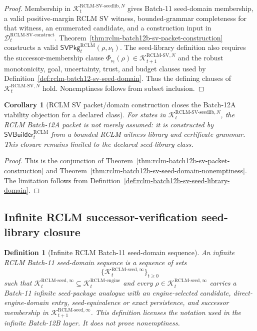 \documentclass[11pt,a4paper]{article}
\newtheorem{corollary}[theorem]{Corollary}
\newtheorem{definition}[theorem]{Definition}
\newcommand{\Kcal}{\mathcal K}
\newcommand{\Dcal}{\mathcal D}
\newcommand{\RCLM}{\mathrm{RCLM}}
\newcommand{\engine}{\mathrm{engine}}
\begin{document}
\begin{proof}
Membership in \(\Kcal_t^{\RCLM\text{-}\mathrm{SV\mbox{-}seedlib},N}\) gives Batch-11 seed-domain membership, a valid positive-margin RCLM SV witness, bounded-grammar completeness for that witness, an enumerated candidate, and a construction input in \(\Dcal_t^{\RCLM\text{-}\mathrm{SV\mbox{-}construct}}\). Theorem~\ref{thm:rclm-batch12b-sv-packet-construction} constructs a valid \(\mathsf{SVPkg}_t^{\RCLM}(\rho,\nu_t)\). The seed-library definition also requires the successor-membership clause \(\Phi_{\nu_t}(\rho)\in\Kcal_{t+1}^{\RCLM\text{-}\mathrm{SV},N}\) and the robust monotonicity, goal, uncertainty, trust, and budget clauses used by Definition~\ref{def:rclm-batch12-sv-seed-domain}. Thus the defining clauses of \(\Kcal_t^{\RCLM\text{-}\mathrm{SV},N}\) hold. Nonemptiness follows from subset inclusion.
\end{proof}

\begin{corollary}[RCLM SV packet/domain construction closes the Batch-12A viability objection for a declared class]
\label{cor:rclm-batch12b-closes-viability-objection-declared-class}
For states in \(\Kcal_t^{\RCLM\text{-}\mathrm{SV\mbox{-}seedlib},N}\), the RCLM Batch-12A packet is not merely assumed: it is constructed by \(\mathsf{SVBuilder}_t^{\RCLM}\) from a bounded RCLM witness library and certificate grammar. This closure remains limited to the declared seed-library class.
\end{corollary}

\begin{proof}
This is the conjunction of Theorem~\ref{thm:rclm-batch12b-sv-packet-construction} and Theorem~\ref{thm:rclm-batch12b-sv-seed-domain-nonemptiness}. The limitation follows from Definition~\ref{def:rclm-batch12b-sv-seed-library-domain}.
\end{proof}

\subsection{Infinite RCLM successor-verification seed-library closure}

\begin{definition}[Infinite RCLM Batch-11 seed-domain sequence]
\label{def:rclm-batch12b-infinite-batch11-seed-domain}
An infinite RCLM Batch-11 seed-domain sequence is a sequence of sets
\[
\{\Kcal_t^{\RCLM\text{-}\mathrm{seed},\infty}\}_{t\ge0}
\]
such that \(\Kcal_t^{\RCLM\text{-}\mathrm{seed},\infty}\subseteq\Kcal_t^{\RCLM\text{-}\engine}\) and every \(\rho\in\Kcal_t^{\RCLM\text{-}\mathrm{seed},\infty}\) carries a Batch-11 infinite seed-package analogue with an engine-selected candidate, direct-engine-domain entry, seed-equivalence or exact persistence, and successor membership in \(\Kcal_{t+1}^{\RCLM\text{-}\mathrm{seed},\infty}\).  This definition licenses the notation used in the infinite Batch-12B layer. It does not prove nonemptiness.
\end{definition}
\end{document}
